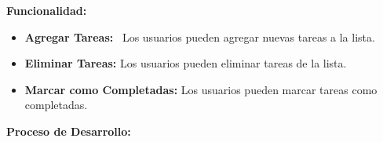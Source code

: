 \documentclass[a4paper]{article}
\begin{document}
\begin{center}
\end{center}

\bigskip


\bigskip


\bigskip


\bigskip


\bigskip


\bigskip


\bigskip


\bigskip


\bigskip


\bigskip


\bigskip


\bigskip


\bigskip


\bigskip


\bigskip


\bigskip


\bigskip


\bigskip


\bigskip


\bigskip


\bigskip


\bigskip


\bigskip


\bigskip


\bigskip


\bigskip


\bigskip


\bigskip


\bigskip


\bigskip


\bigskip

{
\textbf{Funcionalidad:}}

\begin{itemize}[resume*=listWWNumiv]
\item {
\textbf{Agregar Tareas:} \ Los usuarios pueden agregar nuevas tareas a la lista.}
\item {
\textbf{Eliminar Tareas:} Los usuarios pueden eliminar tareas de la lista.}
\item {
\textbf{Marcar como Completadas:} Los usuarios pueden marcar tareas como completadas.}
\end{itemize}
{
\textbf{Proceso de Desarrollo:}}
\end{document}
